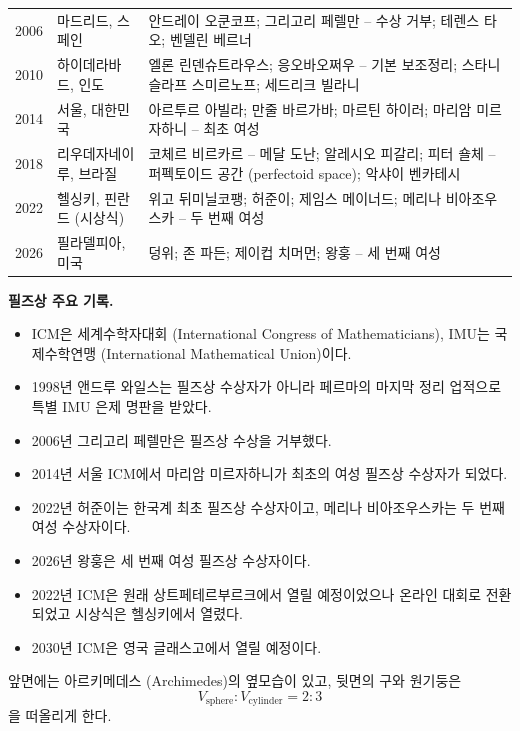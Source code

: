 \begin{center}
\begin{longtable}{@{}L{0.075\textwidth}L{0.22\textwidth}L{0.62\textwidth}@{}}
2006 & 마드리드, 스페인 & 안드레이 오쿤코프; 그리고리 페렐만 -- 수상 거부; 테렌스 타오; 벤델린 베르너\\
2010 & 하이데라바드, 인도 & 엘론 린덴슈트라우스; 응오바오쩌우 -- 기본 보조정리; 스타니슬라프 스미르노프; 세드리크 빌라니\\
2014 & 서울, 대한민국 & 아르투르 아빌라; 만줄 바르가바; 마르틴 하이러; 마리암 미르자하니 -- 최초 여성\\
2018 & 리우데자네이루, 브라질 & 코체르 비르카르 -- 메달 도난; 알레시오 피갈리; 피터 숄체 -- 퍼펙토이드 공간 (perfectoid space); 악샤이 벤카테시\\
2022 & 헬싱키, 핀란드 (시상식) & 위고 뒤미닐코팽; 허준이; 제임스 메이너드; 메리나 비아조우스카 -- 두 번째 여성\\
2026 & 필라델피아, 미국 & 덩위; 존 파든; 제이컵 치머먼; 왕훙 -- 세 번째 여성\\
\end{longtable}
\end{center}

\noindent\textbf{필즈상 주요 기록.}
\begin{itemize}
\item ICM은 세계수학자대회 (International Congress of Mathematicians), IMU는 국제수학연맹 (International Mathematical Union)이다.
\item 1998년 앤드루 와일스는 필즈상 수상자가 아니라 페르마의 마지막 정리 업적으로 특별 IMU 은제 명판을 받았다.
\item 2006년 그리고리 페렐만은 필즈상 수상을 거부했다.
\item 2014년 서울 ICM에서 마리암 미르자하니가 최초의 여성 필즈상 수상자가 되었다.
\item 2022년 허준이는 한국계 최초 필즈상 수상자이고, 메리나 비아조우스카는 두 번째 여성 수상자이다.
\item 2026년 왕훙은 세 번째 여성 필즈상 수상자이다.
\item 2022년 ICM은 원래 상트페테르부르크에서 열릴 예정이었으나 온라인 대회로 전환되었고 시상식은 헬싱키에서 열렸다.
\item 2030년 ICM은 영국 글래스고에서 열릴 예정이다.
\end{itemize}

\begin{fact}[필즈상 메달]
앞면에는 아르키메데스 (Archimedes)의 옆모습이 있고, 뒷면의 구와 원기둥은
\[
V_{\mathrm{sphere}}:V_{\mathrm{cylinder}}=2:3
\]
을 떠올리게 한다.
\end{fact}


